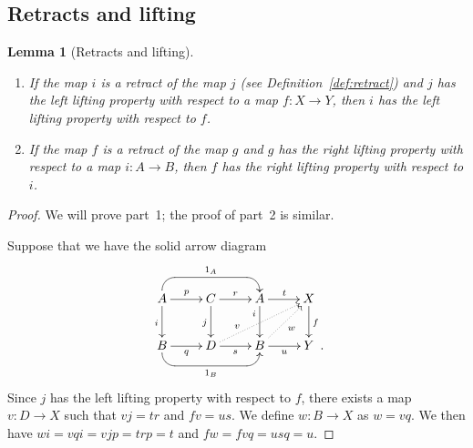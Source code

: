 \documentclass{amsart}
\numberwithin{equation}{section}
\theoremstyle{slplain}
\newtheorem{lem}[equation]{Lemma}
\theoremstyle{definition}
\theoremstyle{remark}
\newcommand{\defref}{Definition~\ref}
\newcommand{\Period}{\rlap{\enspace .}}
\begin{document}
\subsection{Retracts and lifting}
\label{sec:RetLft}


\begin{lem}[Retracts and lifting]
  \label{lem:retractLLP}
  \leavevmode
  \begin{enumerate}
  \item If the map $i$ is a retract of the map $j$ (see
    \defref{def:retract}) and $j$ has the left lifting property
    with respect to a map $f\colon X \to Y$, then $i$ has the left
    lifting property with respect to $f$.
  \item If the map $f$ is a retract of the map $g$ and $g$ has the
    right lifting property with respect to a map $i\colon A \to B$,
    then $f$ has the right lifting property with respect to $i$.
  \end{enumerate}
\end{lem}

\begin{proof}
  We will prove part~1; the proof of part~2 is similar.

  Suppose that we have the solid arrow diagram
  \begin{displaymath}
    \xymatrix{
      {A} \ar[r]^{p} \ar[d]_{i} %
           \ar `u[rr] `[drr]^{1_{A}} [rr]+<0pt,6pt>
      & {C} \ar[r]^{r} \ar[d]_{j}
      & {A} \ar[r]^{t} \ar[d]_(.3){i}
      & {X} \ar[d]^{f}\\
      {B} \ar[r]_{q} %
           \ar `d[rr] `[urr]_{1_{B}} [rr]
      & {D} \ar[r]_{s} \ar@{..>}[urr]^(.3){v}
      & {B} \ar[r]_{u} \ar@{..>}[ur]_{w}
      & {Y \Period}
    }
  \end{displaymath}
  Since $j$ has the left lifting property with respect to $f$, there
  exists a map $v\colon D \to X$ such that $vj = tr$ and $fv = us$.
  We define $w\colon B \to X$ as $w = vq$.  We then have $wi = vqi =
  vjp = trp = t$ and $fw = fvq = usq = u$.
\end{proof}
\end{document}
